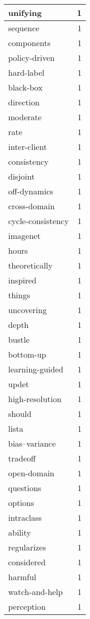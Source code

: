 \begin{table}[h]
\begin{tabular}{|l|r|}
\hline
unifying & 1 \\
\hline
sequence & 1 \\
\hline
components & 1 \\
\hline
policy-driven & 1 \\
\hline
hard-label & 1 \\
\hline
black-box & 1 \\
\hline
direction & 1 \\
\hline
moderate & 1 \\
\hline
rate & 1 \\
\hline
inter-client & 1 \\
\hline
consistency & 1 \\
\hline
disjoint & 1 \\
\hline
off-dynamics & 1 \\
\hline
cross-domain & 1 \\
\hline
cycle-consistency & 1 \\
\hline
imagenet & 1 \\
\hline
hours & 1 \\
\hline
theoretically & 1 \\
\hline
inspired & 1 \\
\hline
things & 1 \\
\hline
uncovering & 1 \\
\hline
depth & 1 \\
\hline
bustle & 1 \\
\hline
bottom-up & 1 \\
\hline
learning-guided & 1 \\
\hline
updet & 1 \\
\hline
high-resolution & 1 \\
\hline
should & 1 \\
\hline
lista & 1 \\
\hline
bias–variance & 1 \\
\hline
tradeoff & 1 \\
\hline
open-domain & 1 \\
\hline
questions & 1 \\
\hline
options & 1 \\
\hline
intraclass & 1 \\
\hline
ability & 1 \\
\hline
regularizes & 1 \\
\hline
considered & 1 \\
\hline
harmful & 1 \\
\hline
watch-and-help & 1 \\
\hline
perception & 1 \\

\end{tabular}
\end{table}
